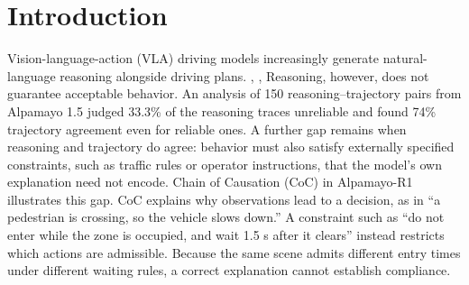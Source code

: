 \documentclass[nolineno]{ieeeaccess}
\begin{document}
\section{Introduction}

Vision-language-action (VLA) driving models increasingly generate natural-language reasoning alongside driving plans. \cite{r1}, \cite{r2}, \cite{r3} Reasoning, however, does not guarantee acceptable behavior. An analysis of 150 reasoning--trajectory pairs from Alpamayo 1.5 judged 33.3\% of the reasoning traces unreliable and found 74\% trajectory agreement even for reliable ones. \cite{r18} A further gap remains when reasoning and trajectory do agree: behavior must also satisfy externally specified constraints, such as traffic rules or operator instructions, that the model's own explanation need not encode. Chain of Causation (CoC) in Alpamayo-R1 illustrates this gap. \cite{r1} CoC explains why observations lead to a decision, as in ``a pedestrian is crossing, so the vehicle slows down.'' A constraint such as ``do not enter while the zone is occupied, and wait 1.5 s after it clears'' instead restricts which actions are admissible. Because the same scene admits different entry times under different waiting rules, a correct explanation cannot establish compliance.\par
\end{document}
